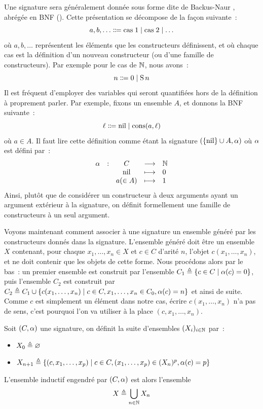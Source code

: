 Une signature sera généralement donnée sous forme dite de
Backus-Naur \cite{Backus1959}, abrégée en BNF
(). Cette
présentation se décompose de la façon suivante~:
\[a,b,\ldots \inddefeq \mathrm{cas}\;1 \mid \mathrm{cas}\;2 \mid \ldots\]
où $a,b,\ldots$ représentent les éléments que les constructeurs définissent,
et où chaque cas est la définition d'un nouveau constructeur (ou d'une famille
de constructeurs). Par exemple pour le cas de $\mathbb N$, nous avons~:
\[n \inddefeq 0 \mid \Ss n\]
Il est fréquent d'employer des variables qui seront quantifiées hors de la
définition à proprement parler. Par exemple, fixons un ensemble $A$, et donnons
la BNF suivante~:
\[\varlist \inddefeq \nil \mid \cons(a,\varlist)\]
où $a \in A$. Il faut lire cette définition comme étant la signature
$(\{\operatorname{nil}\} \cup A,\alpha)$ où $\alpha$
est défini par~:
\[\makeFunBis{\arite}{C}{\bN}{\nil}{0}{a (\in A)}{1}\]
Ainsi, plutôt que de considérer un constructeur à deux arguments ayant un
argument extérieur à la signature, on définit formellement une famille de
constructeurs à un seul argument.

Voyons maintenant comment associer à une signature un ensemble généré par les
constructeurs donnés dans la signature. L'ensemble généré doit être un ensemble
$X$ contenant, pour chaque $x_1,\ldots,x_n \in X$ et $c \in C$ d'arité $n$,
l'objet $c(x_1,\ldots,x_n)$, et ne doit contenir que les objets de cette forme.
Nous procédons alors par le bas~: un premier ensemble est construit par
l'ensemble $C_1 \triangleq \left\{ c \in C \;\middle\vert\; \alpha(c) = 0 \right\}$, puis l'ensemble $C_2$
est construit par
$C_2 \triangleq C_1 \cup \left\{ c(x_1,\ldots,x_n) \;\middle\vert\; c \in C, x_1,\ldots,
  x_n \in C_0, \alpha(c) = n \right\}$ et ainsi de suite. Comme $c$ est simplement un
élément dans notre cas, écrire $c(x_1,\ldots,x_n)$ n'a pas de sens, c'est
pourquoi l'on va utiliser à la place $(c,x_1,\ldots,x_n)$.

\begin{definition}
  Soit $(C,\alpha)$ une signature, on définit la suite d'ensembles
  $(X_i)_{i\in\mathbb N}$ par~:
  \begin{itemize}
  \item $X_0 \triangleq \varnothing$
  \item $X_{n+1} \triangleq
    \left\{ (c,x_1,\ldots,x_p) \;\middle\vert\; c\in C, (x_1,\ldots,x_p)\in (X_n)^p,
    \alpha(c) = p  \right\}$
  \end{itemize}

  L'ensemble inductif engendré par $(C,\alpha)$ est alors l'ensemble
  \[X \triangleq \bigcup_{n\in \mathbb N} X_n\]
\end{definition}

